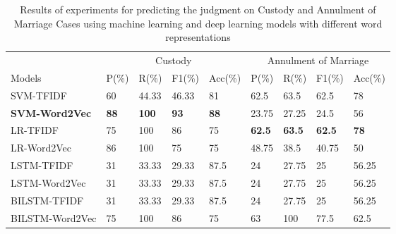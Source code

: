 \documentclass[sn-mathphys,Numbered]{sn-jnl}%
\theoremstyle{thmstyleone}%
\theoremstyle{thmstyletwo}%
\theoremstyle{thmstylethree}%
\begin{document}
\begin{table}[th]
    \centering
    \begin{tabular}{|l|l|l|l|l|l|l|l|l|}
    \hline

             & \multicolumn{4}{c|}{Custody} & \multicolumn{4}{c|}{Annulment of Marriage} \\
      \hhline{~|--------}

        Models & P(\%) & R(\%) & F1(\%) & Acc(\%) & P(\%) & R(\%) & F1(\%) & Acc(\%) \\ \hline
        SVM-TFIDF & 60 & 44.33 & 46.33 & 81 & 62.5 & 63.5 & 62.5 & 78 \\ \hline
        \textbf{SVM-Word2Vec}  & \textbf{88} & \textbf{100 } & \textbf{93} & \textbf{88} & 23.75 & 27.25 & 24.5 & 56 \\ \hline
        LR-TFIDF & 75 & 100 & 86 & 75 & \textbf{62.5 } & \textbf{63.5 } & \textbf{62.5} & \textbf{78 } \\ \hline
        LR-Word2Vec & 86 & 100 & 75 & 75 & 48.75 & 38.5 & 40.75 & 50 \\ \hline
        LSTM-TFIDF & 31 & 33.33 & 29.33 & 87.5 & 24 & 27.75 & 25 & 56.25 \\ \hline
        LSTM-Word2Vec & 31 & 33.33 & 29.33 & 87.5 & 24 & 27.75 & 25 & 56.25 \\ \hline
        BILSTM-TFIDF & 31 & 33.33 & 29.33 & 87.5 & 24 & 27.75 & 25 & 56.25 \\ \hline
        BILSTM-Word2Vec & 75 & 100 & 86 & 75 & 63 & 100 & 77.5 & 62.5 \\ \hline
    \end{tabular}
    \caption{ Results of experiments for predicting the judgment on Custody and Annulment of Marriage Cases using machine learning and deep learning models with different word representations}
    \label{Results of experiments for predicting the judgment on Custody and Annulment of Marriage Cases}
\end{table}
\end{document}
